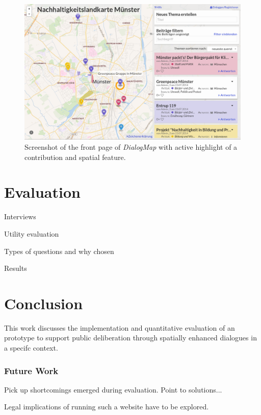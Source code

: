 \documentclass{sigchi}
\begin{document}
\begin{figure}[!h]
    \centering
    \includegraphics[width=0.9\columnwidth]{screenshot}
    \caption{Screenshot of the front page of \textit{DialogMap} with active highlight of a contribution and spatial feature.}
    \label{fig:screenshot}
\end{figure}


\section{Evaluation}

Interviews

Utility evaluation

Types of questions and why chosen

Results

\section{Conclusion}

This work discusses the implementation and quantitative evaluation of an prototype to support public deliberation through spatially enhanced dialogues in a specifc context.

\subsubsection{Future Work}
Pick up shortcomings emerged during evaluation. Point to solutions...

Legal implications of running such a website have to be explored.

\end{document}
